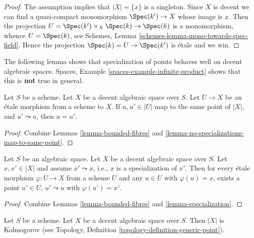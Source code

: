\begin{proof}
The assumption implies that $|X| = \{x\}$ is a singleton. Since
$X$ is decent we can find a quasi-compact monomorphism $\Spec(k') \to X$
whose image is $x$. Then the projection
$U = \Spec(k') \times_X \Spec(k) \to \Spec(k)$
is a monomorphism, whence $U = \Spec(k)$, see
Schemes, Lemma \ref{schemes-lemma-mono-towards-spec-field}.
Hence the projection $\Spec(k) = U \to \Spec(k')$ is \'etale and
we win.
\end{proof}

\noindent
The following lemma shows that specialization of points behaves well
on decent algebraic spaces.
Spaces, Example \ref{spaces-example-infinite-product}
shows that this is {\bf not} true in general.

\begin{lemma}
\label{lemma-decent-no-specializations-map-to-same-point}
Let $S$ be a scheme. Let $X$ be a decent algebraic space over $S$.
Let $U \to X$ be an \'etale morphism from a scheme to $X$.
If $u, u' \in |U|$ map to the same point of $|X|$, and
$u' \leadsto u$, then $u = u'$.
\end{lemma}

\begin{proof}
Combine Lemmas \ref{lemma-bounded-fibres} and
\ref{lemma-no-specializations-map-to-same-point}.
\end{proof}

\begin{lemma}
\label{lemma-decent-specialization}
Let $S$ be an algebraic space. Let $X$ be a decent algebraic space over $S$.
Let $x, x' \in |X|$ and assume $x' \leadsto x$, i.e., $x$ is a
specialization of $x'$. Then for every \'etale morphism
$\varphi : U \to X$ from a scheme $U$ and any $u \in U$ with
$\varphi(u) = x$, exists a point $u'\in U$, $u' \leadsto u$ with
$\varphi(u') = x'$.
\end{lemma}

\begin{proof}
Combine Lemmas \ref{lemma-bounded-fibres} and
\ref{lemma-specialization}.
\end{proof}

\begin{lemma}
\label{lemma-kolmogorov}
Let $S$ be a scheme. Let $X$ be a decent algebraic space over $S$.
Then $|X|$ is Kolmogorov (see
Topology, Definition \ref{topology-definition-generic-point}).
\end{lemma}


